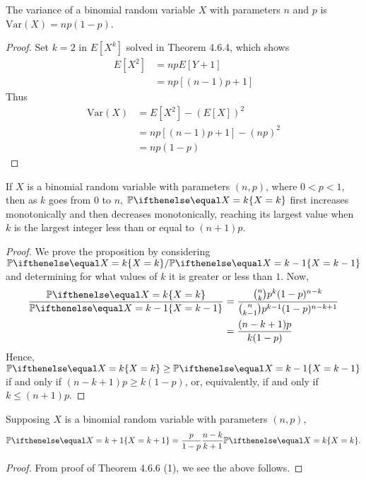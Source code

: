\documentclass[a4paper,11pt]{article}
\begin{document}
\begin{outline}
    The variance of a binomial random variable \(X\) with parameters \(n\) and \(p\) is \(\text{Var}(X) = np(1-p)\).
    
    \begin{proof}
      Set \(k = 2\) in \(E[X^k]\) solved in Theorem 4.6.4, which shows
      \begin{align*}
        E[X^2] &= npE[Y+1] \\
               &= np[(n-1)p + 1]
      \end{align*}
      Thus
      \begin{align*}
        \text{Var}(X) &= E[X^2] - (E[X])^2 \\
                      &= np[(n-1)p+1] - (np)^2 \\
                      &= np(1-p)
      \end{align*}
    \end{proof}
    
    If \(X\) is a binomial random variable with parameters \((n, p)\), where \(0 < p < 1\), then as \(k\) goes 
    from \(0\) to \(n\), \(\bbp[X=k]\) first increases monotonically and then decreases monotonically, reaching 
    its largest value when \(k\) is the largest integer less than or equal to \((n+1)p\).
    
    \pagebreak
    \begin{proof}
      We prove the proposition by considering \(\bbp[X=k]/\bbp[X=k-1]\) and determining for what values of 
      \(k\) it is greater or less than \(1\). Now,
      \begin{align}
        \frac{\bbp[X=k]}{\bbp[X=k-1]} &= \frac{\binom{n}{k}p^k(1-p)^{n-k}}
                                              {\binom{n}{k-1}p^{k-1}(1-p)^{n-k+1}}\nonumber \\
                                      &= \frac{(n-k+1)p}{k(1-p)}
      \end{align}
      Hence, \(\bbp[X=k] \geq \bbp[X=k-1]\) if and only if \((n-k+1)p \geq k(1-p)\), or, equivalently, if and only 
      if \(k \leq (n+1)p\).
    \end{proof}
    
    Supposing \(X\) is a binomial random variable with parameters \((n,p)\),
    \[ \bbp[X=k+1] = \frac{p}{1-p}\frac{n-k}{k+1}\bbp[X=k]\text{.} \]
    
    \begin{proof}
      From proof of Theorem 4.6.6 (1), we see the above follows.
    \end{proof}
    

\end{outline}
\end{document}
